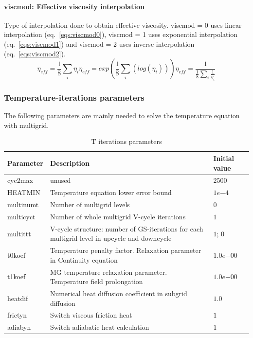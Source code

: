 \paragraph{viscmod: Effective viscosity interpolation}
Type of interpolation done to obtain effective viscosity. viscmod = 0 uses linear interpolation (eq.~\ref{eqs:viscmod0}), viscmod = 1 uses exponential interpolation (eq.~\ref{eqs:viscmod1}) and viscmod = 2 uses inverse interpolation (eq.~\ref{eqs:viscmod2}).
\begin{subequations}
	\begin{equation}\label{eqs:viscmod0}
		\eta_{eff}=\dfrac{1}{8}\sum_{i}\eta_i
	\end{equation}
	\begin{equation}\label{eqs:viscmod1}
		\eta_{eff}=exp{\left(\dfrac{1}{8}\sum_{i}\left(log\left(\eta_i\right)\right)\right)}
	\end{equation}
	\begin{equation}\label{eqs:viscmod2}
		\eta_{eff}=\dfrac{1}{\frac{1}{8}\sum\limits_{i}{\frac{1}{\eta_i}}}
	\end{equation}
\end{subequations}

\subsubsection{Temperature-iterations parameters}
The following parameters are mainly needed to solve the temperature equation with multigrid.

\begin{table}[H]
	\small
	\centering
	\begin{tabular}{l p{9cm} l}
		\toprule
		Parameter & Description & Initial value \\
		\midrule
		cyc2max 	& unused & $2500$\\
		HEATMIN 	& Temperature equation lower error bound & $1e{-4}$\\
		multinumt 	& Number of multigrid levels & $0$\\
		multicyct 	& Number of whole multigrid V-cycle iterations & $1$ \\
		multittt	& V-cycle structure: number of GS-iterations for each multigrid level in upcycle and downcycle & $1$; $0$ \\
		t0koef 		& Temperature penalty factor. Relaxation parameter in Continuity equation & $1.0e{-00}$\\
		t1koef 		& MG temperature relaxation parameter. Temperature field prolongation & $1.0e{-00}$\\
		heatdif 	& Numerical heat diffusion coefficient in subgrid diffusion & $1.0$\\
		frictyn 	& Switch viscous friction heat & $1$\\
		adiabyn 	& Switch adiabatic heat calculation & $1$\\
		\bottomrule
	\end{tabular}
	\caption{T iterations parameters}
	\label{tbl:mode_t_parameters}
\end{table}

